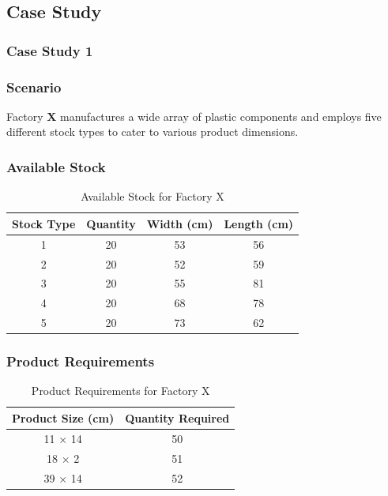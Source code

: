 \documentclass[a4paper]{article}
\begin{document}
\subsection{Case Study}

\subsubsection{Case Study 1}

\subsubsection*{Scenario}
Factory \textbf{X} manufactures a wide array of plastic components and employs five different stock types to cater to various product dimensions.

\subsubsection*{Available Stock}
\begin{table}[H]
    \centering
    \caption{Available Stock for Factory X}
    \begin{tabular}{|c|c|c|c|}
        \hline
        \textbf{Stock Type} & \textbf{Quantity} & \textbf{Width (cm)} & \textbf{Length (cm)} \\ \hline
        1 & 20 & 53 & 56  \\ \hline
        2 & 20 & 52 & 59  \\ \hline
        3 & 20 & 55 & 81  \\ \hline
        4 & 20 & 68 & 78  \\ \hline
        5 & 20 & 73 & 62  \\ \hline
    \end{tabular}
\end{table}

\subsubsection*{Product Requirements}
\begin{table}[H]
    \centering
    \caption{Product Requirements for Factory X}
    \begin{tabular}{|c|c|}
        \hline
        \textbf{Product Size (cm)} & \textbf{Quantity Required} \\ \hline
        11 × 14 & 50 \\ \hline
        18 × 2 & 51 \\ \hline
        39 × 14 & 52 \\ \hline
    \end{tabular}
\end{table}
\end{document}
